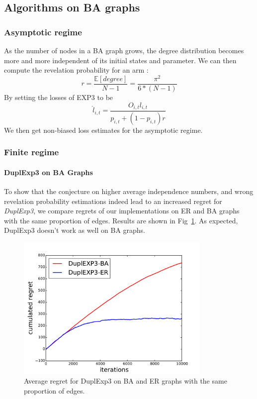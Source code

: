 \documentclass[10pt,a4paper]{scrartcl}
\providecommand{\E}{\mathbb{E}}
\begin{document}
\subsection{Algorithms on BA graphs}
\subsubsection{Asymptotic regime}
As the number of nodes in a BA graph grows, the degree distribution becomes more and more independent of its initial states and parameter. We can then compute the revelation probability for an arm :
$$r = \frac{\E[degree]}{N-1} = \frac{\pi^2}{6*(N-1)}$$
By setting the losses of EXP3 to be 
$$\hat{l}_{i,t} = \frac{O_{i,t}l_{i,t}}{p_{i,t}+(1-p_{i,t})r}$$
We then get non-biased loss estimates for the asymptotic regime.

\subsubsection{Finite regime}
\paragraph{DuplExp3 on BA Graphs}
To show that the conjecture on higher average independence numbers, and wrong revelation probability estimations indeed lead to an increased regret for \emph{DuplExp3}, we compare regrets of our implementations on ER and BA graphs with the same proportion of edges. Results are shown in Fig~\ref{dupl_er_ba}. As expected, DuplExp3 doesn't work as well on BA graphs.

\begin{figure}[h!]
\centering
 \includegraphics[height=7cm]{figures/50compare_dupl_er_ba.pdf}
 \caption{Average regret for DuplExp3 on BA and ER graphs with the same proportion of edges.}
 \label{dupl_er_ba}
\end{figure}
\end{document}
